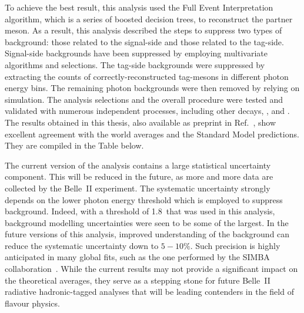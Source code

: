 To achieve the best result, this \BtoXsgamma analysis used the Full Event Interpretation algorithm, which is a series of boosted decision trees, to reconstruct the partner \B meson.
As a result, this analysis described the steps to suppress two types of background: those related to the signal-side and those related to the tag-side.
Signal-side backgrounds have been suppressed by employing multivariate algorithms and selections.
The tag-side backgrounds were suppressed by extracting the counts of correctly-reconstructed tag-\B mesons in different photon energy bins.
The remaining photon backgrounds were then removed by relying on simulation.
The analysis selections and the overall procedure were tested and validated with numerous independent processes, including other \B decays, \mbox{\epem\ra\qqbar}, and \mbox{\epem\ra\mumu}.
The results obtained in this thesis, also available as preprint in Ref.~\cite{Belle-II:2022hys}, show excellent agreement with the world averages and the Standard Model predictions.
They are compiled in the Table below.
\begin{table}[hbtp!]
\end{table}

The current version of the analysis contains a large statistical uncertainty component. 
This will be reduced in the future, as more and more data are collected by the Belle~II experiment.
The systematic uncertainty strongly depends on the lower photon energy threshold which is employed to suppress background.
Indeed, with a threshold of 1.8~\gev that was used in this analysis, background modelling uncertainties were seen to be some of the largest.
In the future versions of this analysis, improved understanding of the background can reduce the systematic uncertainty down to $5-10\%$.
Such precision is highly anticipated in many global fits, such as the one performed by the SIMBA collaboration~\cite{Bernlochner:2020jlt}.
While the current results may not provide a significant impact on the theoretical averages, they serve as a stepping stone for future Belle~II radiative hadronic-tagged analyses that will be leading contenders in the field of flavour physics.






